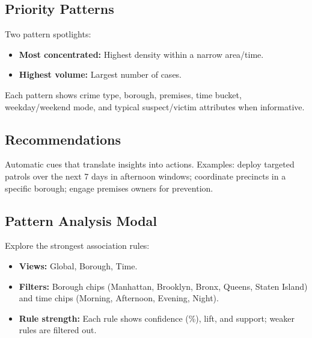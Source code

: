 \documentclass[11pt]{article}
\begin{document}
\subsection{Priority Patterns}
Two pattern spotlights:
\begin{itemize}[leftmargin=*]
  \item \textbf{Most concentrated:} Highest density within a narrow area/time.
  \item \textbf{Highest volume:} Largest number of cases.
\end{itemize}
Each pattern shows crime type, borough, premises, time bucket, weekday/weekend mode, and typical suspect/victim attributes when informative.

\subsection{Recommendations}
Automatic cues that translate insights into actions. Examples: deploy targeted patrols over the next 7 days in afternoon windows; coordinate precincts in a specific borough; engage premises owners for prevention.

\subsection{Pattern Analysis Modal}
Explore the strongest association rules:
\begin{itemize}[leftmargin=*]
  \item \textbf{Views:} Global, Borough, Time.
  \item \textbf{Filters:} Borough chips (Manhattan, Brooklyn, Bronx, Queens, Staten Island) and time chips (Morning, Afternoon, Evening, Night).
  \item \textbf{Rule strength:} Each rule shows confidence (\%), lift, and support; weaker rules are filtered out.
\end{itemize}
\end{document}
